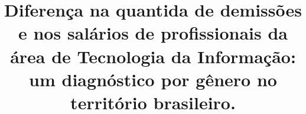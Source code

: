 \title{Diferença na quantida de demissões e nos salários de profissionais da área de Tecnologia da Informação: um diagnóstico por gênero no território brasileiro.  \\
}